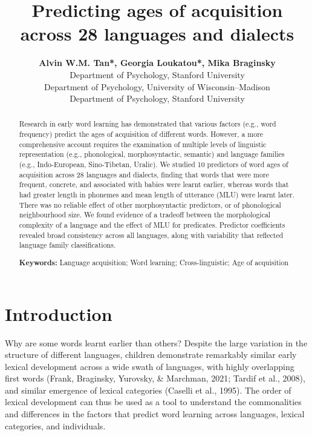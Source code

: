 \documentclass[10pt, letterpaper]{article}
\title{Predicting ages of acquisition across 28 languages and dialects}
\author{{\large \bf Alvin W.M. Tan*, Georgia Loukatou*, Mika Braginsky} \\ Department of Psychology, Stanford University \AND {\large \bf Jessica Mankewitz} \\ Department of Psychology, University of Wisconsin--Madison \AND {\large \bf Michael C. Frank} \\ Department of Psychology, Stanford University}
\begin{document}
\maketitle

\begin{abstract}
Research in early word learning has demonstrated that various factors
(e.g., word frequency) predict the ages of acquisition of different
words. However, a more comprehensive account requires the examination of
multiple levels of linguistic representation (e.g., phonological,
morphosyntactic, semantic) and language families (e.g., Indo-European,
Sino-Tibetan, Uralic). We studied 10 predictors of word ages of
acquisition across 28 languages and dialects, finding that words that
were more frequent, concrete, and associated with babies were learnt
earlier, whereas words that had greater length in phonemes and mean
length of utterance (MLU) were learnt later. There was no reliable
effect of other morphosyntactic predictors, or of phonological
neighbourhood size. We found evidence of a tradeoff between the
morphological complexity of a language and the effect of MLU for
predicates. Predictor coefficients revealed broad consistency across all
languages, along with variability that reflected language family
classifications.

\textbf{Keywords:}
Language acquisition; Word learning; Cross-linguistic; Age of
acquisition
\end{abstract}

\hypertarget{introduction}{%
\section{Introduction}\label{introduction}}

Why are some words learnt earlier than others? Despite the large
variation in the structure of different languages, children demonstrate
remarkably similar early lexical development across a wide swath of
languages, with highly overlapping first words (Frank, Braginsky,
Yurovsky, \& Marchman, 2021; Tardif et al., 2008), and similar emergence
of lexical categories (Caselli et al., 1995). The order of lexical
development can thus be used as a tool to understand the commonalities
and differences in the factors that predict word learning across
languages, lexical categories, and individuals.
\end{document}
